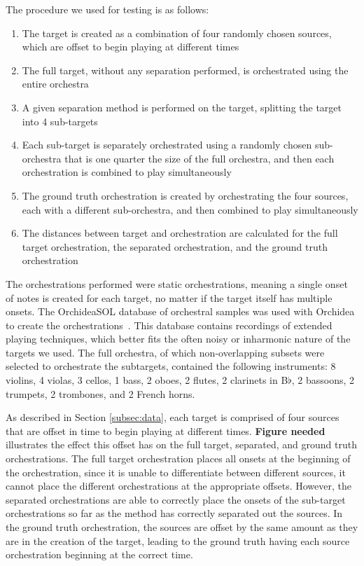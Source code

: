\documentclass{article}
\begin{document}
		The procedure we used for testing is as follows:
		\begin{enumerate}
			\item The target is created as a combination of four randomly chosen sources, which are offset to begin playing at different times
			\item The full target, without any separation performed, is orchestrated using the entire orchestra
			\item A given separation method is performed on the target, splitting the target into 4 sub-targets
			\item Each sub-target is separately orchestrated using a randomly chosen sub-orchestra that is one quarter the size of the full orchestra, and then each orchestration is combined to play simultaneously
			\item The ground truth orchestration is created by orchestrating the four sources, each with a different sub-orchestra, and then combined to play simultaneously
			\item The distances between target and orchestration are calculated for the full target orchestration, the separated orchestration, and the ground truth orchestration 
		\end{enumerate}	
		
		The orchestrations performed were static orchestrations, meaning a single onset of notes is created for each target, no matter if the target itself has multiple onsets. The OrchideaSOL database of orchestral samples was used with Orchidea to create the orchestrations~\cite{Cella2020c}. This database contains recordings of extended playing techniques, which better fits the often noisy or inharmonic nature of the targets we used. The full orchestra, of which non-overlapping subsets were selected to orchestrate the subtargets, contained the following instruments: 8 violins, 4 violas, 3 cellos, 1 bass, 2 oboes, 2 flutes, 2 clarinets in B$\flat$, 2 bassoons, 2 trumpets, 2 trombones, and 2 French horns.
		
		As described in Section \ref{subsec:data}, each target is comprised of four sources that are offset in time to begin playing at different times. \textbf{Figure needed} illustrates the effect this offset has on the full target, separated, and ground truth orchestrations. The full target orchestration places all onsets at the beginning of the orchestration, since it is unable to differentiate between different sources, it cannot place the different orchestrations at the appropriate offsets. However, the separated orchestrations are able to correctly place the onsets of the sub-target orchestrations so far as the method has correctly separated out the sources. In the ground truth orchestration, the sources are offset by the same amount as they are in the creation of the target, leading to the ground truth having each source orchestration beginning at the correct time.
		
\end{document}
